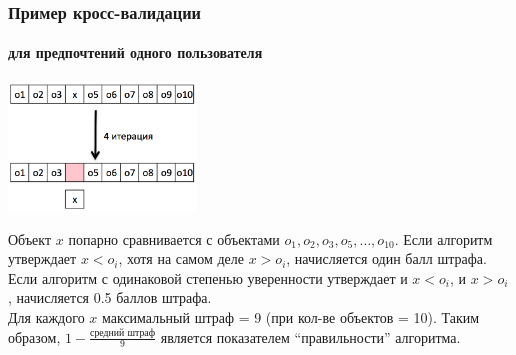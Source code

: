 \documentclass[xcolor=table]{beamer}
\theoremstyle{definition}
\begin{document}
	\begin{frame}
		\frametitle{Пример кросс-валидации}
		\framesubtitle{для предпочтений одного пользователя}
		\begin{center}
			\includegraphics[width=50mm]{./images/cross-validation.png}
		\end{center}
		
		Объект $x$ попарно сравнивается с объектами $o_1, o_2, o_3, o_5, \dots, o_{10}$. Если алгоритм утверждает $x < o_i$, хотя на самом деле $x > o_i$, начисляется один балл штрафа. Если алгоритм с одинаковой степенью уверенности утверждает и $x < o_i$, и  $x > o_i$, начисляется 0.5 баллов штрафа.\\
		\vspace{0.5em}
		Для каждого $x$ максимальный штраф = 9 (при кол-ве объектов = 10). Таким образом, $1 - \frac{\text{средний~штраф}}{9}$ является показателем ``правильности'' алгоритма.
	\end{frame}
	
\end{document}
